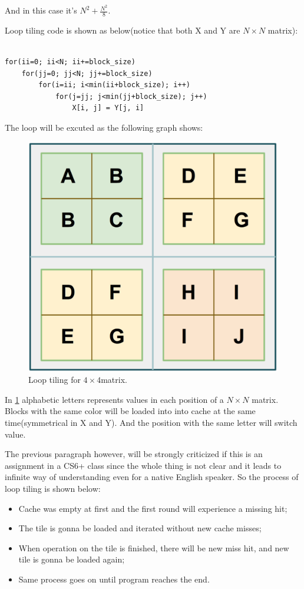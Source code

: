 \documentclass[12pt]{article}
\begin{document}
And in this case it's $N^2+\frac{N^2}{8}$. 

Loop tiling code is shown as below(notice that both X and Y are
$N\times N$ matrix):
\begin{verbatim}

for(ii=0; ii<N; ii+=block_size)
    for(jj=0; jj<N; jj+=block_size)
        for(i=ii; i<min(ii+block_size); i++)
            for(j=jj; j<min(jj+block_size); j++)
                X[i, j] = Y[j, i]
\end{verbatim}



The loop will be excuted as the following graph shows:

\begin{figure}[!ht]
  \centering
  \includegraphics[scale=0.3]{img/mat.png}
  \caption{Loop tiling for $4\times 4$matrix.}
  \label{fig:n}
\end{figure}

In \ref{fig:n} alphabetic letters represents values in each position
of a $N\times N$ matrix. Blocks with the same color will be loaded
into into cache at the same time(symmetrical in X and Y). And the
position with the same letter will switch value. 

The previous paragraph however, will be strongly criticized if this is
an assignment in a CS6+ class since the whole thing is not clear and
it leads to infinite way of understanding even for a native English
speaker. So the process of loop tiling is shown below:
\begin{itemize}
\item Cache was empty at first and the first round will experience a
  missing hit;
\item The tile is gonna be loaded and iterated without new cache
  misses;
\item When operation on the tile is finished, there will be new miss
  hit, and new tile is gonna be loaded again;
\item Same process goes on until program reaches the end.
\end{itemize}
\end{document}
